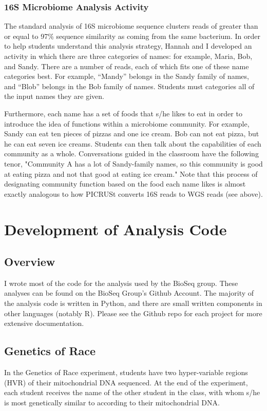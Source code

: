 \documentclass{report}
\begin{document}
\subsection{16S Microbiome Analysis Activity}
The standard analysis of 16S microbiome sequence clusters reads of greater than or equal to 97\% sequence similarity as coming from the same bacterium. In order to help students understand this analysis strategy, Hannah and I developed an activity in which there are three categories of names: for example, Maria, Bob, and Sandy. There are a number of reads, each of which fits one of these name categories best. For example, ``Mandy'' belongs in the Sandy family of names, and ``Blob'' belongs in the Bob family of names. Students must categories all of the input names they are given.

Furthermore, each name has a set of foods that s/he likes to eat in order to introduce the idea of functions within a microbiome community. For example, Sandy can eat ten pieces of pizzas and one ice cream. Bob can not eat pizza, but he can eat seven ice creams. Students can then talk about the capabilities of each community as a whole. Conversations guided in the classroom have the following tenor, "Community A has a lot of Sandy-family names, so this community is good at eating pizza and not that good at eating ice cream." Note that this process of designating community function based on the food each name likes is almost exactly analogous to how PICRUSt converts 16S reads to WGS reads (see above).


\chapter{Development of Analysis Code}
\section{Overview}
I wrote most of the code for the analysis used by the BioSeq group. These analyses can be found on the BioSeq Group's Github Account. The majority of the analysis code is written in Python, and there are small written components in other languages (notably R). Please see the Github repo for each project for more extensive documentation.

\section{Genetics of Race}

In the Genetics of Race experiment, students have two hyper-variable regions (HVR) of their mitochondrial DNA sequenced. At the end of the experiment, each student receives the name of the other student in the class, with whom s/he is most genetically similar to according to their mitochondrial DNA. 
\end{document}
